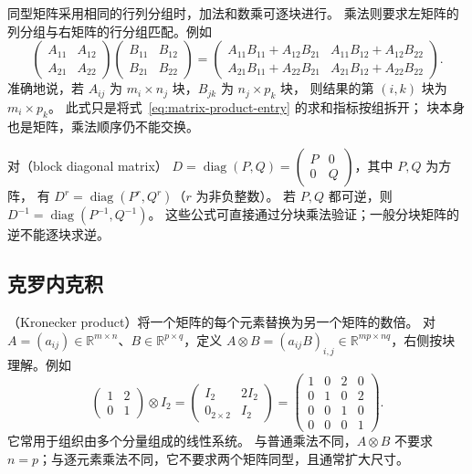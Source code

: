 \documentclass[UTF8,12pt,a4paper,fontset=fandol]{ctexart}
\begin{document}
同型矩阵采用相同的行列分组时，加法和数乘可逐块进行。
乘法则要求左矩阵的列分组与右矩阵的行分组匹配。例如
\[
  \begin{pmatrix}A_{11}&A_{12}\\A_{21}&A_{22}\end{pmatrix}
  \begin{pmatrix}B_{11}&B_{12}\\B_{21}&B_{22}\end{pmatrix}
  =\begin{pmatrix}
    A_{11}B_{11}+A_{12}B_{21}&A_{11}B_{12}+A_{12}B_{22}\\
    A_{21}B_{11}+A_{22}B_{21}&A_{21}B_{12}+A_{22}B_{22}
  \end{pmatrix}.
\]
准确地说，若 $A_{ij}$ 为 $m_i\times n_j$ 块，$B_{jk}$ 为 $n_j\times p_k$ 块，
则结果的第 $(i,k)$ 块为 $m_i\times p_k$。
此式只是将式~\eqref{eq:matrix-product-entry} 的求和指标按组拆开；
块本身也是矩阵，乘法顺序仍不能交换。

对（block diagonal matrix）
$D=\operatorname{diag}(P,Q)=\begin{pmatrix}P&0\\0&Q\end{pmatrix}$，其中 $P,Q$ 为方阵，
有 $D^r=\operatorname{diag}(P^r,Q^r)$（$r$ 为非负整数）。
若 $P,Q$ 都可逆，则 $D^{-1}=\operatorname{diag}(P^{-1},Q^{-1})$。
这些公式可直接通过分块乘法验证；一般分块矩阵的逆不能逐块求逆。

\subsection{克罗内克积}

（Kronecker product）将一个矩阵的每个元素替换为另一个矩阵的数倍。
对 $A=(a_{ij})\in\mathbb R^{m\times n}$、$B\in\mathbb R^{p\times q}$，定义
$A\otimes B=(a_{ij}B)_{i,j}\in\mathbb R^{mp\times nq}$，右侧按块理解。例如
\[
  \begin{pmatrix}1&2\\0&1\end{pmatrix}\otimes I_2
  =\begin{pmatrix}I_2&2I_2\\0_{2\times2}&I_2\end{pmatrix}
  =\begin{pmatrix}1&0&2&0\\0&1&0&2\\0&0&1&0\\0&0&0&1\end{pmatrix}.
\]
它常用于组织由多个分量组成的线性系统。
与普通乘法不同，$A\otimes B$ 不要求 $n=p$；与逐元素乘法不同，它不要求两个矩阵同型，且通常扩大尺寸。
\end{document}
